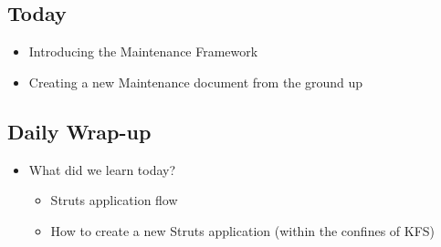 \documentclass[12pt,notitlepage]{article}
\author{Warner Onstine and Leo Przybylski}
\begin{document}
  \W \begin{s5presentation}
  \maketitle
    \W \begin{s5slide}
        \W \section{Today}
        \begin{ifhtml}
            \begin{itemize}
                \item Introducing the Maintenance Framework
                \item Creating a new Maintenance document from the ground up
            \end{itemize}
        \end{ifhtml} 
    \W \end{s5slide}






    \W \begin{s5slide}
        \W \section{Daily Wrap-up}
        \begin{ifhtml}
            \begin{itemize}
                \item What did we learn today?
                \begin{itemize}
                    \item Struts application flow
                    \item How to create a new Struts application (within the confines of KFS)
                \end{itemize}
            \end{itemize}
        \end{ifhtml} 
    \W \end{s5slide}
    
    \W \end{s5presentation}
\end{document}
